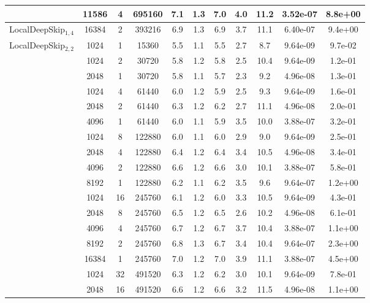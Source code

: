 \begin{table}[!htp]
\begin{tabular}{|c|c|c|c|c|c|c|c|c|c|c|}
 & 11586 & 4 & 695160 & 7.1 & 1.3 & 7.0 & 4.0 & 11.2 & 3.52e-07 & 8.8e+00\\ \cline{2-11}
\hline\hline
\multirow{1}{*}{LocalDeepSkip$_{1,4}$} & \cellcolor{pink}16384 & \cellcolor{pink}2 & \cellcolor{pink}393216 & \cellcolor{pink}6.9 & \cellcolor{pink}1.3 & \cellcolor{pink}6.9 & \cellcolor{pink}3.7 & \cellcolor{pink}11.1 & \cellcolor{pink}6.40e-07 & \cellcolor{pink}9.4e+00\\ \cline{2-11}
\hline\hline
\multirow{24}{*}{LocalDeepSkip$_{2,2}$} & 1024 & 1 & 15360 & 5.5 & 1.1 & 5.5 & 2.7 & 8.7 & 9.64e-09 & 9.7e-02\\ \cline{2-11}
 & 1024 & 2 & 30720 & 5.8 & 1.2 & 5.8 & 2.5 & 10.4 & 9.64e-09 & 1.2e-01\\ \cline{2-11}
 & 2048 & 1 & 30720 & 5.8 & 1.1 & 5.7 & 2.3 & 9.2 & 4.96e-08 & 1.3e-01\\ \cline{2-11}
 & 1024 & 4 & 61440 & 6.0 & 1.2 & 5.9 & 2.5 & 9.3 & 9.64e-09 & 1.6e-01\\ \cline{2-11}
 & 2048 & 2 & 61440 & 6.3 & 1.2 & 6.2 & 2.7 & 11.1 & 4.96e-08 & 2.0e-01\\ \cline{2-11}
 & 4096 & 1 & 61440 & 6.0 & 1.1 & 5.9 & 3.5 & 10.0 & 3.88e-07 & 3.2e-01\\ \cline{2-11}
 & 1024 & 8 & 122880 & 6.0 & 1.1 & 6.0 & 2.9 & 9.0 & 9.64e-09 & 2.5e-01\\ \cline{2-11}
 & 2048 & 4 & 122880 & 6.4 & 1.2 & 6.4 & 3.4 & 10.5 & 4.96e-08 & 3.4e-01\\ \cline{2-11}
 & 4096 & 2 & 122880 & 6.6 & 1.2 & 6.6 & 3.0 & 10.1 & 3.88e-07 & 5.8e-01\\ \cline{2-11}
 & 8192 & 1 & 122880 & 6.2 & 1.1 & 6.2 & 3.5 & 9.6 & 9.64e-07 & 1.2e+00\\ \cline{2-11}
 & 1024 & 16 & 245760 & 6.1 & 1.2 & 6.0 & 3.3 & 10.5 & 9.64e-09 & 4.3e-01\\ \cline{2-11}
 & 2048 & 8 & 245760 & 6.5 & 1.2 & 6.5 & 2.6 & 10.2 & 4.96e-08 & 6.1e-01\\ \cline{2-11}
 & 4096 & 4 & 245760 & 6.7 & 1.2 & 6.7 & 3.7 & 10.4 & 3.88e-07 & 1.1e+00\\ \cline{2-11}
 & 8192 & 2 & 245760 & 6.8 & 1.3 & 6.7 & 3.4 & 10.4 & 9.64e-07 & 2.3e+00\\ \cline{2-11}
 & 16384 & 1 & 245760 & 7.0 & 1.2 & 7.0 & 3.9 & 11.1 & 3.88e-07 & 4.5e+00\\ \cline{2-11}
 & 1024 & 32 & 491520 & 6.3 & 1.2 & 6.2 & 3.0 & 10.1 & 9.64e-09 & 7.8e-01\\ \cline{2-11}
 & 2048 & 16 & 491520 & 6.6 & 1.2 & 6.6 & 3.2 & 11.5 & 4.96e-08 & 1.1e+00\\ \cline{2-11}

\end{tabular}
\end{table}
